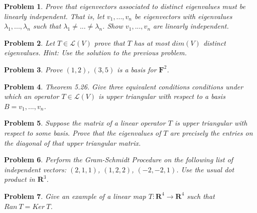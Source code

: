 \documentclass{article}
\theoremstyle{problemstyle}
\newtheorem{problem}{Problem}
\theoremstyle{problemstyle}
\theoremstyle{problemstyle}
\theoremstyle{problemstyle}
\begin{document}
\begin{problem}
Prove that eigenvectors associated to distinct eigenvalues must be linearly independent. That is, let $v_1,...,v_n$ be eigenvectors with eigenvalues $\lambda_1,...,\lambda_n$ such that $\lambda_1 \neq...\neq \lambda_n$. Show $v_1,...,v_n$ are linearly independent. 
\end{problem}

\begin{problem}
Let $T \in \mathscr{L}(V)$ prove that $T$ has at most $dim(V)$ distinct eigenvalues. Hint: Use the solution to the previous problem. 
\end{problem}

\begin{problem}
Prove $(1,2)$, $(3,5)$ is a basis for $\textbf{F}^2$. 
\end{problem}

\begin{problem}
Theorem 5.26. Give three equivalent conditions conditions under which an operator $T \in \mathscr{L}(V)$ is upper triangular with respect to a basis $B = v_1,...,v_n$. 
\end{problem}

\begin{problem}
Suppose the matrix of a linear operator $T$ is upper triangular with respect to some basis. Prove that the eigenvalues of $T$ are precisely the entries on the diagonal of that upper triangular matrix. 
\end{problem}

\begin{problem}
Perform the Gram-Schmidt Procedure on the following list of independent vectors: $(2,1,1)$, $(1,2,2)$, $(-2,-2,1)$. Use the usual dot product in $\textbf{R}^3$. 
\end{problem}

\begin{problem}
Give an example of a linear map $T:\textbf{R}^4 \rightarrow \textbf{R}^4$ such that $Ran \ T = Ker \ T$. 
\end{problem}
\end{document}
